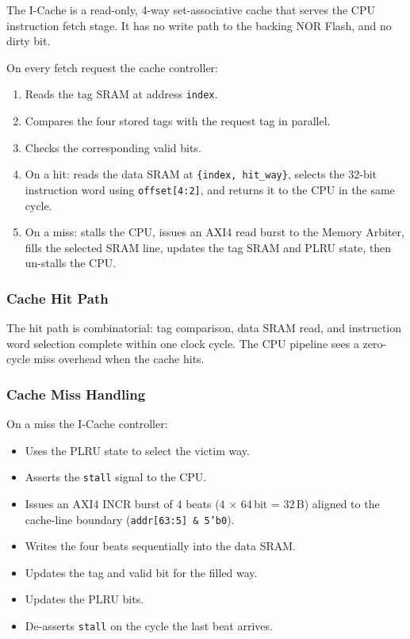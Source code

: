The I-Cache is a read-only, 4-way set-associative cache that serves the
CPU instruction fetch stage.
It has no write path to the backing NOR Flash, and no dirty bit.

On every fetch request the cache controller:
\begin{enumerate}
  \item Reads the tag SRAM at address \texttt{index}.
  \item Compares the four stored tags with the request tag in parallel.
  \item Checks the corresponding valid bits.
  \item On a hit: reads the data SRAM at \texttt{\{index, hit\_way\}},
    selects the 32-bit instruction word using \texttt{offset[4:2]},
    and returns it to the CPU in the same cycle.
  \item On a miss: stalls the CPU, issues an AXI4 read burst to the
    Memory Arbiter, fills the selected SRAM line, updates the tag SRAM and
    PLRU state, then un-stalls the CPU.
\end{enumerate}

\subsubsection{Cache Hit Path}

The hit path is combinatorial: tag comparison, data SRAM read, and
instruction word selection complete within one clock cycle.
The CPU pipeline sees a zero-cycle miss overhead when the cache hits.

\subsubsection{Cache Miss Handling}

On a miss the I-Cache controller:
\begin{itemize}
  \item Uses the PLRU state to select the victim way.
  \item Asserts the \texttt{stall} signal to the CPU.
  \item Issues an AXI4 INCR burst of 4 beats (4 $\times$ 64\,bit = 32\,B)
    aligned to the cache-line boundary (\texttt{addr[63:5] \& 5'b0}).
  \item Writes the four beats sequentially into the data SRAM.
  \item Updates the tag and valid bit for the filled way.
  \item Updates the PLRU bits.
  \item De-asserts \texttt{stall} on the cycle the last beat arrives.
\end{itemize}

